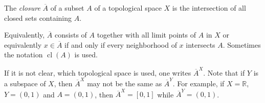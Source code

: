 \documentclass[12pt]{article}
\begin{document}
The \emph{closure} $\overline{A}$ of a subset $A$ of a topological space $X$ is the intersection of all closed sets containing $A$.

Equivalently, $\overline{A}$ consists of $A$ together with all limit points of $A$ in $X$ or equivalently $x\in\overline{A}$ if and only if every neighborhood of $x$ intersects $A$. Sometimes the notation $\operatorname{cl}(A)$ is used.

If it is not clear, which topological space is used, one writes $\overline{A}^X$. Note that if $Y$ is a subspace of $X$, then $\overline{A}^X$ may not be the same as $\overline{A}^Y$.  For example, if $X=\mathbb{R}$, $Y=(0,1)$ and $A=(0,1)$, then $\overline{A}^X=[0,1]$ while $\overline{A}^Y=(0,1)$.
\end{document}
